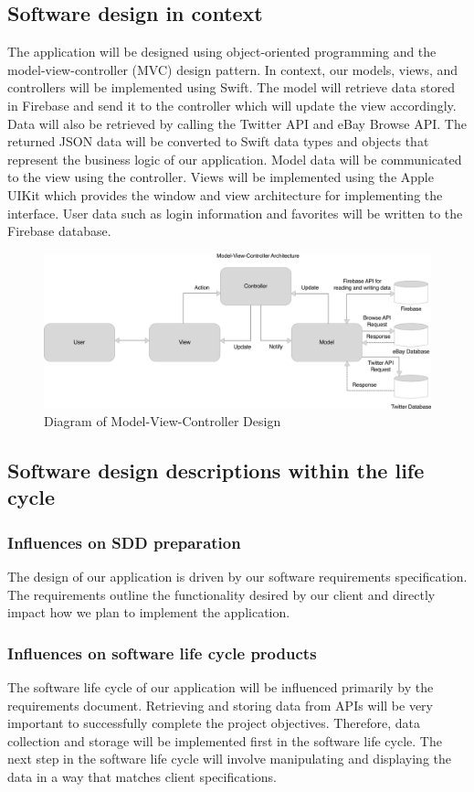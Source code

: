 \documentclass[onecolumn, draftclsnofoot,10pt, compsoc]{IEEEtran}
\begin{document}
\subsection{Software design in context}
The application will be designed using object-oriented programming and the model-view-controller (MVC) design pattern. 
In context, our models, views, and controllers will be implemented using Swift. 
The model will retrieve data stored in Firebase and send it to the controller which will update the view accordingly\cite{fb}. 
Data will also be retrieved by calling the Twitter API and eBay Browse API. The returned JSON data will be converted to Swift data types and objects that represent the business logic of our application. Model data will be communicated to the view using the controller. 
Views will be implemented using the Apple UIKit which provides the window and view architecture for implementing the interface.
User data such as login information and favorites will be written to the Firebase database. 
\begin{figure}[H]
\centering
\includegraphics[scale=.20]{MVC}
\caption{Diagram of Model-View-Controller Design}
\end{figure}

\subsection{Software design descriptions within the life cycle}
 
\subsubsection{Influences on SDD preparation}
The design of our application is driven by our software requirements specification. 
The requirements outline the functionality desired by our client and directly impact how we plan to implement the application.
\subsubsection{Influences on software life cycle products}
The software life cycle of our application will be influenced primarily by the requirements document. Retrieving and storing data from APIs will be very important to successfully complete the project objectives. 
Therefore, data collection and storage will be implemented first in the software life cycle. 
The next step in the software life cycle will involve manipulating and displaying the data in a way that matches client specifications.
\end{document}
